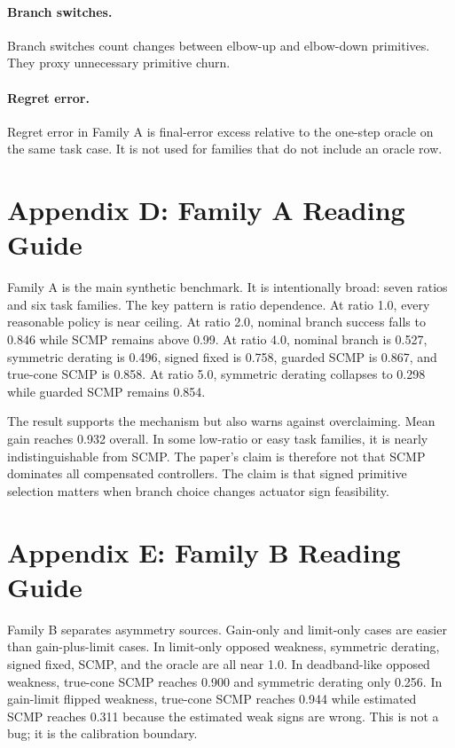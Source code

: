 \documentclass{article}
\begin{document}
\paragraph{Branch switches.}
Branch switches count changes between elbow-up and elbow-down primitives. They proxy unnecessary primitive churn.

\paragraph{Regret error.}
Regret error in Family A is final-error excess relative to the one-step oracle on the same task case. It is not used for families that do not include an oracle row.

\section{Appendix D: Family A Reading Guide}

Family A is the main synthetic benchmark. It is intentionally broad: seven ratios and six task families. The key pattern is ratio dependence. At ratio 1.0, every reasonable policy is near ceiling. At ratio 2.0, nominal branch success falls to 0.846 while SCMP remains above 0.99. At ratio 4.0, nominal branch is 0.527, symmetric derating is 0.496, signed fixed is 0.758, guarded SCMP is 0.867, and true-cone SCMP is 0.858. At ratio 5.0, symmetric derating collapses to 0.298 while guarded SCMP remains 0.854.

The result supports the mechanism but also warns against overclaiming. Mean gain reaches 0.932 overall. In some low-ratio or easy task families, it is nearly indistinguishable from SCMP. The paper's claim is therefore not that SCMP dominates all compensated controllers. The claim is that signed primitive selection matters when branch choice changes actuator sign feasibility.

\section{Appendix E: Family B Reading Guide}

Family B separates asymmetry sources. Gain-only and limit-only cases are easier than gain-plus-limit cases. In limit-only opposed weakness, symmetric derating, signed fixed, SCMP, and the oracle are all near 1.0. In deadband-like opposed weakness, true-cone SCMP reaches 0.900 and symmetric derating only 0.256. In gain-limit flipped weakness, true-cone SCMP reaches 0.944 while estimated SCMP reaches 0.311 because the estimated weak signs are wrong. This is not a bug; it is the calibration boundary.
\end{document}
